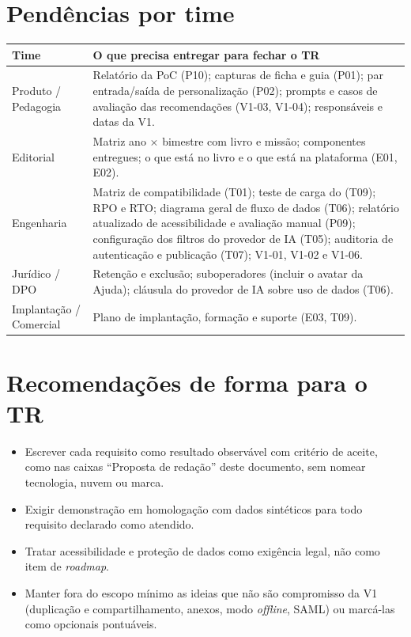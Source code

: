 \section{Pendências por time}

\begin{center}
\footnotesize\renewcommand{\arraystretch}{1.35}
\begin{tabularx}{\linewidth}{@{}L{34mm}X@{}}
\toprule
\textbf{Time} & \textbf{O que precisa entregar para fechar o TR}\\
\midrule
\endhead
Produto / Pedagogia & Relatório da PoC (P10); capturas de ficha e guia (P01);
  par entrada/saída de personalização (P02); prompts e casos de avaliação
  das recomendações (V1-03, V1-04); responsáveis e datas da V1.\\
Editorial & Matriz ano $\times$ bimestre com livro e missão; componentes
  entregues; o que está no livro e o que está na plataforma (E01, E02).\\
Engenharia & Matriz de compatibilidade (T01); teste de carga do
   (T09); RPO e RTO; diagrama geral de fluxo de dados (T06);
  relatório atualizado de acessibilidade e avaliação manual (P09);
  configuração dos filtros do provedor de IA (T05); auditoria de
  autenticação e publicação (T07); V1-01, V1-02 e V1-06.\\
Jurídico / DPO & Retenção e exclusão; suboperadores (incluir o avatar da
  Ajuda); cláusula do provedor de IA sobre uso de dados (T06).\\
Implantação / Comercial & Plano de implantação, formação e suporte (E03,
  T09).\\
\bottomrule
\end{tabularx}
\end{center}

\section{Recomendações de forma para o TR}

\begin{itemize}
  \item Escrever cada requisito como resultado observável com critério de
    aceite, como nas caixas ``Proposta de redação'' deste documento, sem
    nomear tecnologia, nuvem ou marca.
  \item Exigir demonstração em homologação com dados sintéticos para todo
    requisito declarado como atendido.
  \item Tratar acessibilidade e proteção de dados como exigência legal, não
    como item de \emph{roadmap}.
  \item Manter fora do escopo mínimo as ideias que não são compromisso da V1
    (duplicação e compartilhamento, anexos, modo \emph{offline}, SAML) ou
    marcá-las como opcionais pontuáveis.
\end{itemize}
